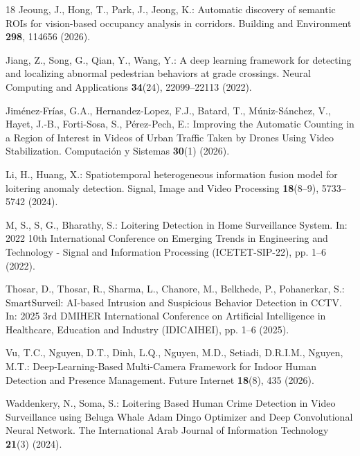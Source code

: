\documentclass[runningheads]{llncs}
\begin{document}
\begin{thebibliography}{18}
Jeoung, J., Hong, T., Park, J., Jeong, K.: Automatic discovery of semantic ROIs for vision-based occupancy analysis in corridors. Building and Environment \textbf{298}, 114656 (2026). 

Jiang, Z., Song, G., Qian, Y., Wang, Y.: A deep learning framework for detecting and localizing abnormal pedestrian behaviors at grade crossings. Neural Computing and Applications \textbf{34}(24), 22099--22113 (2022). 

Jiménez-Frías, G.A., Hernandez-Lopez, F.J., Batard, T., Múniz-Sánchez, V., Hayet, J.-B., Forti-Sosa, S., Pérez-Pech, E.: Improving the Automatic Counting in a Region of Interest in Videos of Urban Traffic Taken by Drones Using Video Stabilization. Computación y Sistemas \textbf{30}(1) (2026).

Li, H., Huang, X.: Spatiotemporal heterogeneous information fusion model for loitering anomaly detection. Signal, Image and Video Processing \textbf{18}(8--9), 5733--5742 (2024). 

M, S., S, G., Bharathy, S.: Loitering Detection in Home Surveillance System. In: 2022 10th International Conference on Emerging Trends in Engineering and Technology - Signal and Information Processing (ICETET-SIP-22), pp. 1--6 (2022). 

Thosar, D., Thosar, R., Sharma, L., Chanore, M., Belkhede, P., Pohanerkar, S.: SmartSurveil: AI-based Intrusion and Suspicious Behavior Detection in CCTV. In: 2025 3rd DMIHER International Conference on Artificial Intelligence in Healthcare, Education and Industry (IDICAIHEI), pp. 1--6 (2025). 

Vu, T.C., Nguyen, D.T., Dinh, L.Q., Nguyen, M.D., Setiadi, D.R.I.M., Nguyen, M.T.: Deep-Learning-Based Multi-Camera Framework for Indoor Human Detection and Presence Management. Future Internet \textbf{18}(8), 435 (2026). 

Waddenkery, N., Soma, S.: Loitering Based Human Crime Detection in Video Surveillance using Beluga Whale Adam Dingo Optimizer and Deep Convolutional Neural Network. The International Arab Journal of Information Technology \textbf{21}(3) (2024). 


\end{thebibliography}
\end{document}
